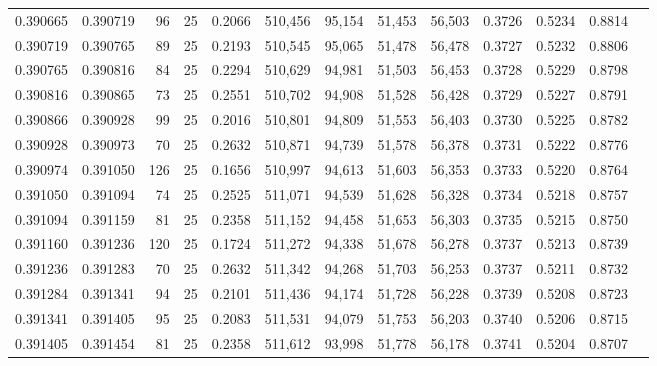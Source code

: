\begin{tabular}{rrrrrrrrrrrrr}
0.390665 & 0.390719 &    96 &  25 &                                     0.2066 & 510,456 &  95,154 &  51,453 &  56,503 & 0.3726 & 0.5234 & 0.8814 \\
0.390719 & 0.390765 &    89 &  25 &                                     0.2193 & 510,545 &  95,065 &  51,478 &  56,478 & 0.3727 & 0.5232 & 0.8806 \\
0.390765 & 0.390816 &    84 &  25 &                                     0.2294 & 510,629 &  94,981 &  51,503 &  56,453 & 0.3728 & 0.5229 & 0.8798 \\
0.390816 & 0.390865 &    73 &  25 &                                     0.2551 & 510,702 &  94,908 &  51,528 &  56,428 & 0.3729 & 0.5227 & 0.8791 \\
0.390866 & 0.390928 &    99 &  25 &                                     0.2016 & 510,801 &  94,809 &  51,553 &  56,403 & 0.3730 & 0.5225 & 0.8782 \\
0.390928 & 0.390973 &    70 &  25 &                                     0.2632 & 510,871 &  94,739 &  51,578 &  56,378 & 0.3731 & 0.5222 & 0.8776 \\
0.390974 & 0.391050 &   126 &  25 &                                     0.1656 & 510,997 &  94,613 &  51,603 &  56,353 & 0.3733 & 0.5220 & 0.8764 \\
0.391050 & 0.391094 &    74 &  25 &                                     0.2525 & 511,071 &  94,539 &  51,628 &  56,328 & 0.3734 & 0.5218 & 0.8757 \\
0.391094 & 0.391159 &    81 &  25 &                                     0.2358 & 511,152 &  94,458 &  51,653 &  56,303 & 0.3735 & 0.5215 & 0.8750 \\
0.391160 & 0.391236 &   120 &  25 &                                     0.1724 & 511,272 &  94,338 &  51,678 &  56,278 & 0.3737 & 0.5213 & 0.8739 \\
0.391236 & 0.391283 &    70 &  25 &                                     0.2632 & 511,342 &  94,268 &  51,703 &  56,253 & 0.3737 & 0.5211 & 0.8732 \\
0.391284 & 0.391341 &    94 &  25 &                                     0.2101 & 511,436 &  94,174 &  51,728 &  56,228 & 0.3739 & 0.5208 & 0.8723 \\
0.391341 & 0.391405 &    95 &  25 &                                     0.2083 & 511,531 &  94,079 &  51,753 &  56,203 & 0.3740 & 0.5206 & 0.8715 \\
0.391405 & 0.391454 &    81 &  25 &                                     0.2358 & 511,612 &  93,998 &  51,778 &  56,178 & 0.3741 & 0.5204 & 0.8707 \\

\end{tabular}
